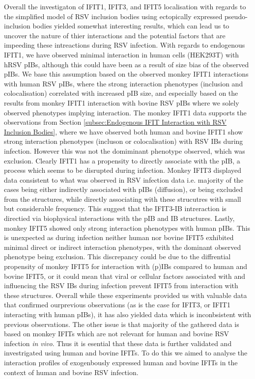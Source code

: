 Overall the investigaton of IFIT1, IFIT3, and IFIT5 localisation with regards to the simplified model of RSV inclusion bodies using ectopically expressed pseudo-inclusion bodies yielded somewhat interesting results, which can lead us to uncover the nature of thier interactions and the potential factors that are impeeding these intreactions during RSV infection. With regards to endogenous IFIT1, we have observed minimal interaction in human cells (HEK293T) with hRSV pIBs, although this could have been as a result of size bias of the observed pIBs. We base this assumption based on the observed monkey IFIT1 interactions with human RSV pIBs, where the strong interaction phenotypes (inclusion and colocalisation) correlated with increased pIB size, and especially based on the results from monkey IFIT1 interaction with bovine RSV pIBs where we solely observed phenotypes implying interaction. The monkey IFIT1 data supports the observations from Section \ref{subsec:Endogenous IFIT Interaction with RSV Inclusion Bodies}, where we have observed both human and bovine IFIT1 show strong interaction phenotypes (incluson or colocalisation) with RSV IBs during infection. However this was not the domiminant phenotype observed, which was exclusion. Clearly IFIT1 has a propensity to directly associate with the pIB, a process which seems to be disrupted during infection. Monkey IFIT3 displayed data consistent to what was observed in RSV infection data i.e. majority of the cases being either indirectly associated with pIBs (diffusion), or being excluded from the structures, while directly associating with these strucutres with small but considerable frequency. This suggest that the IFIT3-IB intreraction is directied via biophysical interactions with the pIB and IB structures. Lastly, monkey IFIT5 showed only strong interaction phenotypes with human pIBs. This is unexpected as during infection neither human nor bovine IFIT5 exhibited minimal direct or indirect interaction phenotypes, with the dominant observed phenotype being exclusion. This discrepancy could be due to the diffrential propensity of monkey IFIT5 for interaction with (p)IBs compared to human and bovine IFIT5, or it could mean that viral  or cellular factors associated with and influencing the RSV IBs during infection prevent IFIT5 from interaction with these structures. Overall while these experiments provided us with valuable data that confirmed ourprevious observations (as is the case for IFIT3, or IFIT1 interacting with human pIBs), it has also yielded data which is inconbsistent with previous observations. The other issue is that majority of the gathered data is based on monkey IFITs which are not relevant for human and bovine RSV infection \textit{in vivo}. Thus it is esential that these data is further validated and investrigated using human and bovine IFITs. To do this we aimed to analyse the interaction profiles of exogenbously expressed human and bovine IFITs in the context of human and bovine RSV infection.

